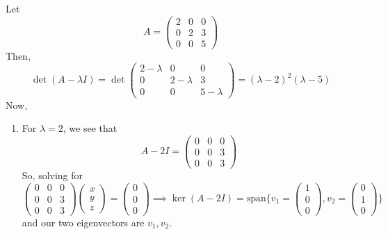 	\begin{example}
	  \label{ex:same-eigenvalues}
	  Let 
		\begin{equation}
			A = \begin{pmatrix} 2 & 0 & 0 \\ 0 & 2 & 3 \\ 0 & 0 & 5 \end{pmatrix}
		\end{equation}
		Then, 
		\begin{equation}
			\det(A - \lambda I) = \det \begin{pmatrix} 2 - \lambda & 0 & 0 \\ 0 & 2 - \lambda & 3 \\ 0 & 0 & 5 - \lambda\end{pmatrix} = (\lambda - 2)^2 (\lambda - 5)
		\end{equation}
		Now, 
		\begin{enumerate}
		  \item For $\lambda = 2$, we see that 
				\begin{equation}
				  A - 2I = \begin{pmatrix} 0 & 0 & 0 \\ 0 & 0 & 3 \\ 0 & 0 & 3 \end{pmatrix}
				\end{equation}
				So, solving for 
				\begin{equation}
					\begin{pmatrix} 0 & 0 & 0 \\ 0 & 0 & 3 \\ 0 & 0 & 3 \end{pmatrix} \begin{pmatrix} x \\ y \\ z \end{pmatrix} = \begin{pmatrix} 0 \\ 0 \\ 0 \end{pmatrix} \implies \ker(A - 2I) = \mathrm{span} \bigg\{ v_1 = \begin{pmatrix} 1 \\ 0 \\ 0 \end{pmatrix}, v_2 = \begin{pmatrix} 0 \\ 1 \\ 0 \end{pmatrix} \bigg\}
				\end{equation} 
				and our two eigenvectors are $v_1, v_2$. 


\end{enumerate}
\end{example}
